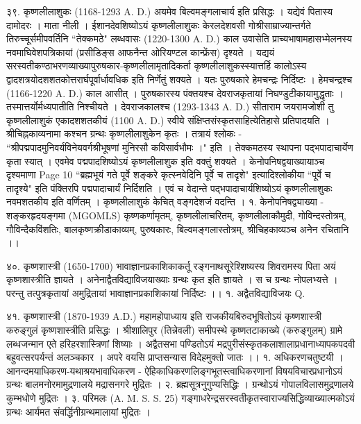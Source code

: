 ३९. कृष्णलीलाशुकः (1168-1293 A. D.)
अयमेव बिल्वमङ्गलाचार्य इति प्रसिद्धः । यद्येवं पितास्य दामोदरः । माता नीली । ईशानदेवशिष्योऽयं कृष्णलीलाशुकः केरलदेशवसी गोश्रीसाम्राज्यान्तर्गते तिरुच्चूर्समीपवर्तिनि ``तेक्कमठे" लब्धवासः (1220-1300 A. D.) काल उवासेति प्राच्यभाषामहासभ्मेलनस्य नवमाघिवेशपत्रिकायां (प्रसीडिङ्स आफनैन्त ओरियण्टल कान्फ्रेंस) दृश्यते ।
यद्ययं सरस्वतीकण्ठाभरणव्याख्यापुरुषकार-कृष्णलीलामृतादिकर्ता कृष्णलीलाशुकस्स्यात्तर्हि कालोऽस्य द्वादशत्रयोदशशतकोत्तरार्घपूर्वार्धावधिक इति निर्णेतुं शक्यते । यतः पुरुषकारे हेमचन्द्रः निर्दिष्टः । हेमचन्द्रश्च (1166-1220 A. D.) काल आसीत् । पुरुषकारस्य पंक्तयश्च देवराजकृतायां निघण्डुटीकायामुद्धृताः । तस्मात्तर्योर्मध्यपातीति निश्चीयते । देवराजकालश्च (1293-1343 A. D.) सीताराम जयरामजोशी तु कृष्णलीलाशुकं एकादशशतकीयं (1100 A. D.) स्वीये संक्षिप्तसंस्कृतसाहित्येतिहासे प्रतिपादयति ।
श्रीचिह्नकाव्यनामा कश्चन ग्रन्थः कृष्णलीलाशुकेन कृतः । तत्रायं श्लोकः - ``श्रीपद्मपादमुनिवर्यविनेयवर्गश्रीभूषणां मुनिरसौ कविसार्वभौमः ।" इति । तेक्कमठस्य स्थापना पद्भपादाचार्येण कृता स्यात् । एवमेव पद्मपादशिष्योऽयं कृष्णलीलाशुक इति वक्तुं शक्यते । केनोपनिषद्वयाख्यायाञ्च दृश्यमाणा Page 10 ``ब्रह्मभूयं गते पूर्वे शङ्करे कृत्स्नवेदिनि पूर्वे च तादृशे" इत्यादिश्लोकीया ``पूर्वे च तादृश्ये" इति पंक्तिरपि पद्मपादाचार्यं निर्दिशति । एवं च वेदान्ते पद्भपादाचार्यशिष्योऽयं कृष्णलीलाशुकः नवमशतकीय इति वर्णितम् । कृष्णलीलाशुकं केचित् वङ्गदेशजं वदन्ति ।
१. केनोपनिषद्व्याख्या - शङ्करहृदयङ्गमा (MGOMLS)
कृष्णकर्णामृतम्, कृष्णलीलाचरितम्, कृष्णलीलाकौमुदी, गोविन्दस्तोत्रम्, गौविन्दैकविंशतिः, बालकृष्णक्रीडाकाव्यम्, पुरुषकारः, बिल्वमङ्गलास्तोत्रम्, श्रीचिहकाव्यञ्च अनेेन रचितानि ।।

४०. कृष्णशास्त्री (1650-1700)
भावाज्ञानप्रकाशिकाकर्तू रङ्गनाथसूरेश्शिष्यस्य शिवरामस्य पिता अयं कृष्णशास्त्रीति ज्ञायते । अनेनाद्वैतविद्याविजयाख्याः ग्रन्थः कृत इति ज्ञायते । स च ग्रन्थः नोपलभ्यत्ते । परन्तु तत्पुत्रकृतायां अमुद्रितायां भावाज्ञानप्रकाशिकायां निर्दिष्टः ।।
१. अद्वैतविद्याविजयः Q.

४१. कृष्णशास्त्री (1870-1939 A.D.)
महामहोपाध्याय इति राजकीयबिरुदभूषितोऽयं कृष्णशास्त्री करुङ्गुलं कृष्णशास्त्रीति प्रसिद्धः । श्रीशालिपुर (तिन्नेवली) समीपस्थे कृष्णतटाकाख्ये (करुङ्गुलम्) ग्रामे लब्धजन्मान एते हरिहरशास्त्रिणां शिष्याः । अद्वैतसभा पण्डितोऽयं मद्रपुरीसंस्कृतकलाशालाप्रधानाध्यापकपदवी बहुवत्सरपर्यन्तं अलञ्चकार । अपरे वयसि प्राप्तसन्यास विदेहमुक्तो जातः ।।
१. अधिकरणचतुष्टयी ।
आनन्दमयाधिकरण-यथाश्रयभावाधिकरण - ऐहिकाधिकरणलिङ्गभूतस्त्वाधिकरणानां विषयविचारप्रधानोऽयं ग्रन्थः बालमनोरमामुद्रणालये मद्रासनगरे मुद्रितः ।
२. ब्रह्मसूत्रनुगुण्यसिद्धिः । ग्रन्थोऽयं गोपालविलासमुद्रणालये कुम्भधोणे मुद्रितः ।
३. परिमलः (A. M. S. S. 25)
गङ्गाधरेन्द्रसरस्वतीकृतस्वाराज्यसिद्धिव्याख्यात्मकोऽयं ग्रन्थः आर्यमत संवर्द्धिनीग्रन्थमालायां मुद्रितः ।

